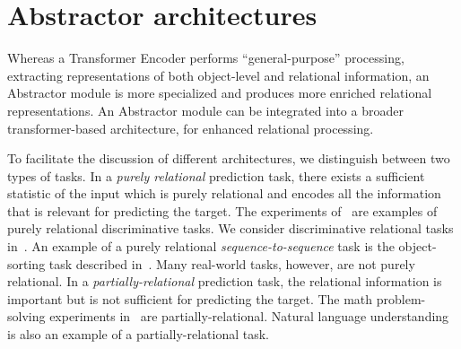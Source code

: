 \section{Abstractor architectures}\label{sec:abstractor_architectures}


Whereas a Transformer Encoder performs ``general-purpose'' processing, extracting representations of both object-level and relational information, an Abstractor module is more specialized and produces more enriched relational representations. An Abstractor module can be integrated into a broader transformer-based architecture, for enhanced relational processing.

To facilitate the discussion of different architectures, we distinguish between two types of tasks. In a \textit{purely relational} prediction task, there exists a sufficient statistic of the input which is purely relational and encodes all the information that is relevant for predicting the target. The experiments of~\citep{esbn,kerg2022neural} are examples of purely relational discriminative tasks. We consider discriminative relational tasks in~. An example of a purely relational \textit{sequence-to-sequence} task is the object-sorting task described in~.
Many real-world tasks, however, are not purely relational. In a \textit{partially-relational} prediction task, the relational information is important but is not sufficient for predicting the target. The math problem-solving experiments in~ are partially-relational. Natural language understanding is also an example of a partially-relational task.


